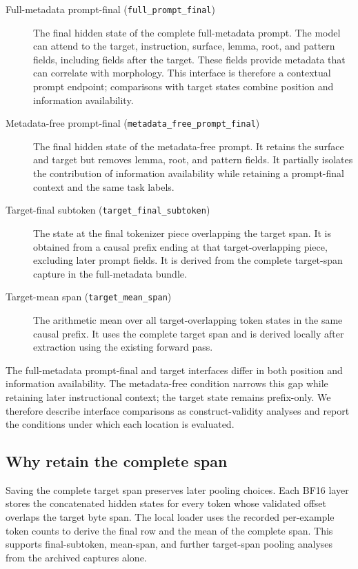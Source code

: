 \documentclass[pdflatex,sn-basic]{sn-jnl}
\newcommand{\promptfinal}{\texttt{full\_prompt\_final}}
\newcommand{\metafree}{\texttt{metadata\_free\_prompt\_final}}
\newcommand{\targetfinal}{\texttt{target\_final\_subtoken}}
\newcommand{\targetmean}{\texttt{target\_mean\_span}}
\begin{document}
\begin{description}
    \item[Full-metadata prompt-final (\promptfinal)] The final hidden state
    of the complete full-metadata prompt. The model can attend to the target,
    instruction, surface, lemma, root, and pattern fields, including fields
    after the target. These fields provide metadata that can correlate with
    morphology. This interface is therefore a contextual prompt endpoint;
    comparisons with target states combine position and information
    availability.
    \item[Metadata-free prompt-final (\metafree)] The final hidden state of
    the metadata-free prompt. It retains the surface and target but removes
    lemma, root, and pattern fields. It partially isolates the contribution of
    information availability while retaining a prompt-final context and the
    same task labels.
    \item[Target-final subtoken (\targetfinal)] The state at the final
    tokenizer piece overlapping the target span. It is obtained from a causal
    prefix ending at that target-overlapping piece, excluding later prompt
    fields. It is derived from the complete target-span capture in the
    full-metadata bundle.
    \item[Target-mean span (\targetmean)] The arithmetic mean over all
    target-overlapping token states in the same causal prefix. It uses the
    complete target span and is derived locally after extraction using the
    existing forward pass.
\end{description}

The full-metadata prompt-final and target interfaces differ in both position
and information availability. The metadata-free condition narrows this gap
while retaining later instructional context; the target state remains
prefix-only. We therefore describe interface comparisons as construct-validity
analyses and report the conditions under which each location is evaluated.

\subsection{Why retain the complete span}

Saving the complete target span preserves later pooling choices. Each BF16
layer stores the concatenated hidden states for every token whose validated
offset overlaps the target byte span. The
local loader uses the recorded per-example token counts to derive the final
row and the mean of the complete span. This supports final-subtoken,
mean-span, and further target-span pooling analyses from the archived captures
alone.
\end{document}
